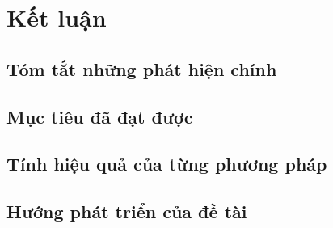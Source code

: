 \section{Kết luận}

\subsection{Tóm tắt những phát hiện chính}

\subsection{Mục tiêu đã đạt được}

\subsection{Tính hiệu quả của từng phương pháp}

\subsection{Hướng phát triển của đề tài}